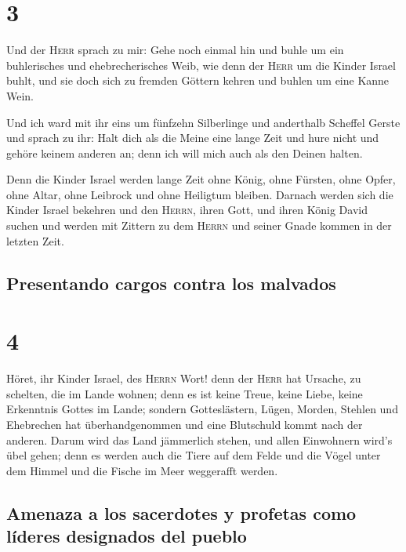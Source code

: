 \hypertarget{section-2}{%
\section{3}\label{section-2}}

 Und der \textsc{Herr} sprach zu mir: Gehe noch einmal hin
und buhle um ein buhlerisches und ehebrecherisches Weib, wie denn der
\textsc{Herr} um die Kinder Israel buhlt, und sie doch sich zu fremden
Göttern kehren und buhlen um eine Kanne Wein.

 Und ich ward mit ihr eins um fünfzehn Silberlinge und
anderthalb Scheffel Gerste  und sprach zu ihr: Halt dich
als die Meine eine lange Zeit und hure nicht und gehöre keinem anderen
an; denn ich will mich auch als den Deinen halten.

 Denn die Kinder Israel werden lange Zeit ohne König, ohne
Fürsten, ohne Opfer, ohne Altar, ohne Leibrock und ohne Heiligtum
bleiben.  Darnach werden sich die Kinder Israel bekehren
und den \textsc{Herrn}, ihren Gott, und ihren König David suchen und
werden mit Zittern zu dem \textsc{Herrn} und seiner Gnade kommen in der
letzten Zeit.

\hypertarget{presentando-cargos-contra-los-malvados}{%
\subsection{Presentando cargos contra los
malvados}\label{presentando-cargos-contra-los-malvados}}

\hypertarget{section-3}{%
\section{4}\label{section-3}}

 Höret, ihr Kinder Israel, des \textsc{Herrn} Wort! denn
der \textsc{Herr} hat Ursache, zu schelten, die im Lande wohnen; denn es
ist keine Treue, keine Liebe, keine Erkenntnis Gottes im Lande;
 sondern Gotteslästern, Lügen, Morden, Stehlen und
Ehebrechen hat überhandgenommen und eine Blutschuld kommt nach der
anderen.  Darum wird das Land jämmerlich stehen, und allen
Einwohnern wird's übel gehen; denn es werden auch die Tiere auf dem
Felde und die Vögel unter dem Himmel und die Fische im Meer weggerafft
werden.

\hypertarget{amenaza-a-los-sacerdotes-y-profetas-como-luxedderes-designados-del-pueblo}{%
\subsection{Amenaza a los sacerdotes y profetas como líderes designados
del
pueblo}\label{amenaza-a-los-sacerdotes-y-profetas-como-luxedderes-designados-del-pueblo}}

